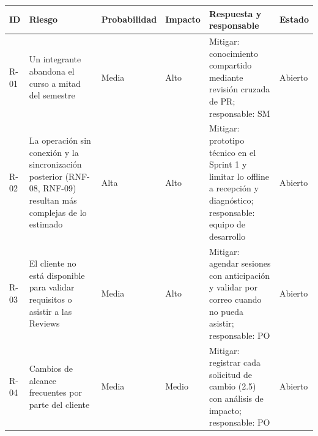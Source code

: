 {\def\LTcaptype{none} %
\begin{longtable}[]{@{}
  >{\raggedright\arraybackslash}p{}
  >{\raggedright\arraybackslash}p{}
  >{\raggedright\arraybackslash}p{}
  >{\raggedright\arraybackslash}p{}
  >{\raggedright\arraybackslash}p{}
  >{\raggedright\arraybackslash}p{}@{}}
\toprule\noalign{}
\begin{minipage}[b]{\linewidth}\raggedright
\textbf{ID}
\end{minipage} & \begin{minipage}[b]{\linewidth}\raggedright
\textbf{Riesgo}
\end{minipage} & \begin{minipage}[b]{\linewidth}\raggedright
\textbf{Probabilidad}
\end{minipage} & \begin{minipage}[b]{\linewidth}\raggedright
\textbf{Impacto}
\end{minipage} & \begin{minipage}[b]{\linewidth}\raggedright
\textbf{Respuesta y responsable}
\end{minipage} & \begin{minipage}[b]{\linewidth}\raggedright
\textbf{Estado}
\end{minipage} \\
\midrule\noalign{}
\endhead
\bottomrule\noalign{}
\endlastfoot
R-01 & Un integrante abandona el curso a mitad del semestre & Media &
Alto & Mitigar: conocimiento compartido mediante revisión cruzada de PR;
responsable: SM & Abierto \\
R-02 & La operación sin conexión y la sincronización posterior (RNF-08,
RNF-09) resultan más complejas de lo estimado & Alta & Alto & Mitigar:
prototipo técnico en el Sprint 1 y limitar lo offline a recepción y
diagnóstico; responsable: equipo de desarrollo & Abierto \\
R-03 & El cliente no está disponible para validar requisitos o asistir a
las Reviews & Media & Alto & Mitigar: agendar sesiones con anticipación
y validar por correo cuando no pueda asistir; responsable: PO &
Abierto \\
R-04 & Cambios de alcance frecuentes por parte del cliente & Media &
Medio & Mitigar: registrar cada solicitud de cambio (2.5) con análisis
de impacto; responsable: PO & Abierto \\

\end{longtable}}
